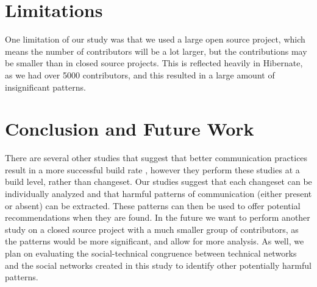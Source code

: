 \documentclass[conference]{IEEEtran}
\begin{document}
\section{Limitations}
One limitation of our study was that we used a large open source project, which means the number of contributors will be a lot larger, but the contributions may be smaller than in closed source projects.   This is reflected heavily in Hibernate, as we had over 5000 contributors, and this resulted in a large amount of insignificant patterns.  

\section{Conclusion and Future Work}
There are several other studies that suggest that better communication practices result in a more successful build rate \cite{Wolf:2009:PBF:1555001.1555017}\cite{Schroter:2010:PBO:1810295.1810456}\cite{4721184}\cite{Zimmermann:2008:PDU:1368088.1368161}, however they perform these studies at a build level, rather than changeset.  Our studies suggest that each changeset can be individually analyzed and that harmful patterns of communication (either present or absent) can be extracted.  These patterns can then be used to offer potential recommendations when they are found.  In the future we want to perform another study on a closed source project with a much smaller group of contributors, as the patterns would be more significant, and allow for more analysis. As well, we plan on evaluating the social-technical congruence between technical networks and the social networks created in this study to identify other potentially harmful patterns. 




\end{document}
